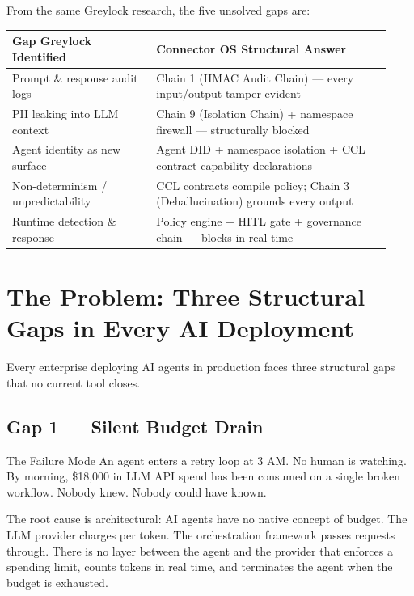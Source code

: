 \documentclass[11pt,a4paper]{article}
\begin{document}
From the same Greylock research, the five unsolved gaps are:

\begin{center}
\begin{tabular}{@{}p{0.35\linewidth}p{0.58\linewidth}@{}}
\toprule
\textbf{Gap Greylock Identified} & \textbf{Connector OS Structural Answer} \\
\midrule
Prompt \& response audit logs & Chain 1 (HMAC Audit Chain) — every input/output tamper-evident \\
PII leaking into LLM context & Chain 9 (Isolation Chain) + namespace firewall — structurally blocked \\
Agent identity as new surface & Agent DID + namespace isolation + CCL contract capability declarations \\
Non-determinism / unpredictability & CCL contracts compile policy; Chain 3 (Dehallucination) grounds every output \\
Runtime detection \& response & Policy engine + HITL gate + governance chain — blocks in real time \\
\bottomrule
\end{tabular}
\end{center}

\clearpage

\section{The Problem: Three Structural Gaps in Every AI Deployment}
\label{sec:problem}

Every enterprise deploying AI agents in production faces three structural gaps that no current tool closes.

\subsection{Gap 1 — Silent Budget Drain}

\begin{dangerbox}{The Failure Mode}
An agent enters a retry loop at 3 AM. No human is watching. By morning, \$18{,}000 in
LLM API spend has been consumed on a single broken workflow. Nobody knew. Nobody could have known.
\end{dangerbox}

The root cause is architectural: AI agents have no native concept of budget. The LLM provider charges per token.
The orchestration framework passes requests through. There is no layer between the agent and the provider that
enforces a spending limit, counts tokens in real time, and terminates the agent when the budget is exhausted.
\end{document}
